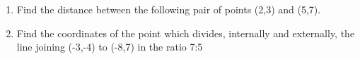 \renewcommand{\theequation}{\theenumi}
\renewcommand{\thefigure}{\theenumi}
\begin{enumerate}[label=\thesubsection.\arabic*.,ref=\thesubsection.\theenumi]

\item Find the distance between the following pair of points (2,3) and (5,7). 
\\
\solution
%

\item Find the coordinates of the point which divides, internally and externally, the line joining (-3,-4) to (-8,7) in the ratio 7:5
\\
\solution
 

% 

\end{enumerate}
